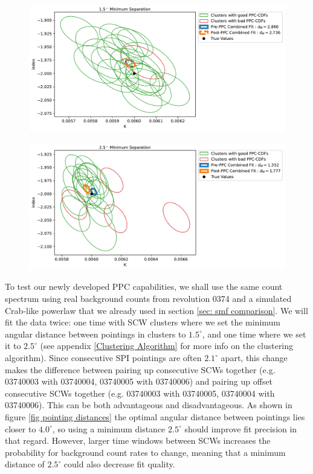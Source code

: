 \documentclass{report}
\begin{document}
\begin{figure}[h]
  \centering
  \includegraphics[width=\textwidth]{Images/PPC_and_Background_Analysis/combined_plot_0374_ppc_normal.pdf}
  \caption{}
  \label{}
\end{figure}

\begin{figure}[h]
  \centering
  \includegraphics[width=\textwidth]{Images/PPC_and_Background_Analysis/combined_plot_0374_ppc_far.pdf}
  \caption{}
  \label{}
\end{figure}

To test our newly developed PPC capabilities, we shall use the same count spectrum using real background counts from revolution 0374 and a simulated Crab-like powerlaw that we already used in section \ref{sec: smf comparison}. We will fit the data twice: one time with SCW clusters where we set the minimum angular distance between pointings in clusters to $1.5^\circ$, and one time where we set it to $2.5^\circ$ (see appendix \ref{Clustering Algorithm} for more info on the clustering algorithm). Since consecutive SPI pointings are often $2.1^\circ$ apart, this change makes the difference between pairing up consecutive SCWs together (e.g. 03740003 with 03740004, 03740005 with 03740006) and pairing up offset consecutive SCWs together (e.g. 03740003 with 03740005, 03740004 with 03740006). This can be both advantageous and disadvantageous. As shown in figure \ref{fig pointing distances} the optimal angular distance between pointings lies closer to $4.0^\circ$, so using a minimum distance $2.5^\circ$ should improve fit precision in that regard. However, larger time windows between SCWs increases the probability for background count rates to change, meaning that a minimum distance of $2.5^\circ$ could also decrease fit quality. 
\end{document}
